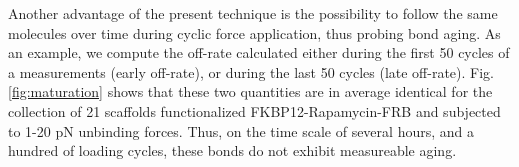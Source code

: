 \documentclass{biophys-new}
\begin{document}
Another advantage of the present technique is the possibility to follow the same molecules over time during cyclic force application, thus probing bond aging. As an example, we compute the off-rate calculated either during the first 50 cycles of a measurements (early off-rate), or during the last 50 cycles (late off-rate). Fig. \ref{fig:maturation} shows that these two quantities are in average identical for the collection of 21 scaffolds functionalized FKBP12-Rapamycin-FRB and subjected to 1-20 pN unbinding forces. Thus, on the time scale of several hours, and a hundred of loading cycles, these bonds do not exhibit measureable aging. 


%
%
%
%
%



%
%
%
%
%
%
%
%


\end{document}
